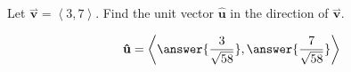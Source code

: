 \documentclass{ximera}
\author{Gregory Hartman \and Matthew Carr}
\begin{document}
\begin{exercise}
Let $\overset{\boldsymbol{\rightharpoonup}}{\mathbf{v}} = \left\langle 3,7 \right\rangle$. Find the unit vector $\mathbf{\hat{u}}$ in the
direction of $\overset{\boldsymbol{\rightharpoonup}}{\mathbf{v}}$.

\begin{prompt}
\[
\mathbf{\hat{u}} = \left\langle \answer{\frac{3}{\sqrt{58}}},\answer{\frac{7}{\sqrt{58}}} \right\rangle
\]
\end{prompt}

\end{exercise}
\end{document}
